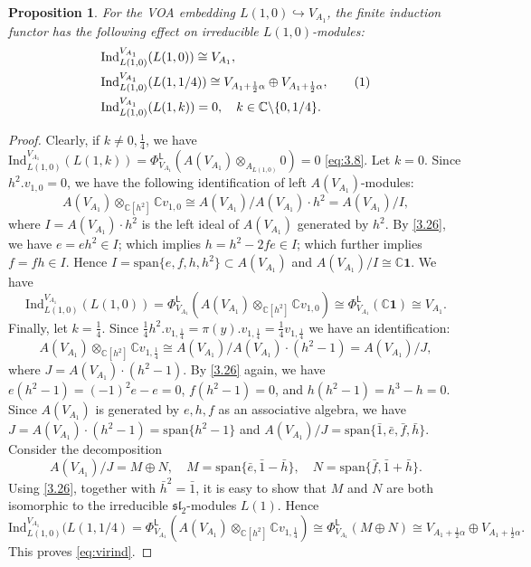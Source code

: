 \documentclass[12pt,a4paper,reqno]{amsart}
\numberwithin{equation}{section}
\numberwithin{equation}{section}
\newtheorem{prop}[thm]{Proposition}
\newcommand\numberthis{\addtocounter{equation}{1}\tag{\theequation}}
\theoremstyle{definition}
\def \C {\mathbb{C}}
\def \al{\alpha}
\def\hr{\hookrightarrow}
\def \op {\oplus}
\def \vac {\mathbf{1}}
\def\Ind{\mathrm{Ind}}
\def \bs {\backslash}
\def\L{\mathcal{L}}
\def\o{\otimes}
\def\spn{\mathrm{span}}
\def\Ind{\mathrm{Ind}}
\def\L{\mathsf{L}}
\def\L{\mathsf{L}}
\def\sl{\mathfrak{sl}}
\begin{document}
	\begin{prop}\label{prop:rankonevir}
		For the VOA embedding $L(1,0)\hr V_{A_1}$, the finite induction functor has the following effect on irreducible $L(1,0)$-modules:
		\begin{align*}
			&\Ind^{V_{A_1}}_{L(1,0)}(L(1,0))\cong V_{A_1},\\
			&\Ind^{V_{A_1}}_{L(1,0)}(L(1,1/4))\cong V_{A_1+\frac{1}{2}\al}\op V_{A_1+\frac{1}{2}\al},\numberthis\label{eq:virind}\\
			&\Ind^{V_{A_1}}_{L(1,0)}(L(1,k))=0,\quad k\in \C\bs\{0,1/4\}. 
		\end{align*}
	\end{prop}
	\begin{proof}
		Clearly, if $k\neq 0,\frac{1}{4}$, we have  $\Ind^{V_{A_1}}_{L(1,0)}(L(1,k))=\Phi^\L_{V_{A_1}}(A(V_{A_1})\o_{A_{L(1,0)}}0)=0$ \eqref{eq:3.8}. Let $k=0$. Since $h^2.v_{1,0}=0$, we have the following identification of left $A(V_{A_1})$-modules: 
		$$A(V_{A_1})\o_{\C[h^2]} \C v_{1,0}\cong A(V_{A_1})/A(V_{A_1})\cdot  h^2=A(V_{A_1})/I,$$
		where $I=A(V_{A_1})\cdot  h^2$ is the left ideal of $A(V_{A_1})$ generated by $h^2$. By \eqref{3.26}, we have $e=eh^2\in I$; which implies $h=h^2-2fe\in I$; which further implies $f=fh\in I$. Hence $I=\spn\{e,f,h,h^2\}\subset A(V_{A_1})$ and $A(V_{A_1})/I\cong \C \vac$. We have 
		$$
		\Ind^{V_{A_1}}_{L(1,0)}(L(1,0))=\Phi^\L_{V_{A_1}}(A(V_{A_1})\o_{\C[h^2]} \C v_{1,0})\cong \Phi^\L_{V_{A_1}}(\C\vac)\cong V_{A_1}.
		$$
		Finally, let $k=\frac{1}{4}$. Since $\frac{1}{4}h^2.v_{1,\frac{1}{4}}=\pi (y).v_{1,\frac{1}{4}}=\frac{1}{4}v_{1,\frac{1}{4}}$ we have an identification:
		$$A(V_{A_1})\o_{\C[h^2]} \C v_{1,\frac{1}{4}}\cong A(V_{A_1})/A(V_{A_1})\cdot (h^2-1)=A(V_{A_1})/J,$$
		where $J=A(V_{A_1})\cdot (h^2-1)$. By \eqref{3.26} again, we have $e(h^2-1)=(-1)^2e-e=0$, $f(h^2-1)=0$, and $h(h^2-1)=h^3-h=0$. Since $A(V_{A_1})$ is generated by $e,h,f$ as an associative algebra,  we have $J=A(V_{A_1})\cdot (h^2-1)=\spn\{ h^2-1\}$ and $A(V_{A_1})/J=\spn\{\bar{1},\bar{e},\bar{f},\bar{h}\}.$ Consider the decomposition 
		$$A(V_{A_1})/J=M\op N,\quad M=\spn\{\bar{e},\bar{1}-\bar{h}\},\quad N=\spn\{\bar{f},\bar{1}+\bar{h} \}.$$
		Using \eqref{3.26}, together with $\bar{h}^2=\bar{1}$, it is easy to show that $M$ and $N$ are both isomorphic to the irreducible $\sl_2$-modules $L(1)$. Hence 
		$$
		\Ind^{V_{A_1}}_{L(1,0)}(L(1,1/4)=\Phi^\L_{V_{A_1}}(A(V_{A_1})\o_{\C[h^2]} \C v_{1,\frac{1}{4}})\cong \Phi^\L_{V_{A_1}}(M\op N)\cong V_{A_1+\frac{1}{2}\al}\op V_{A_1+\frac{1}{2}\al}.
		$$
		This proves \eqref{eq:virind}. 
	\end{proof}
	
\end{document}
